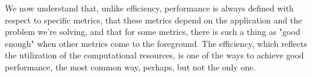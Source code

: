 We now understand that, unlike efficiency, performance is always defined with respect to specific metrics, that these metrics depend on the application and the problem we're solving, and that for some metrics, there is such a thing as "good enough" when other metrics come to the foreground. The efficiency, which reflects the utilization of the computational resources, is one of the ways to achieve good performance, the most common way, perhaps, but not the only one.












